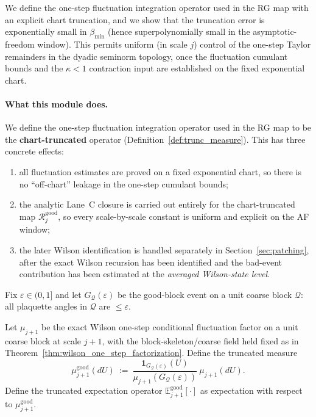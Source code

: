 We define the one-step fluctuation integration operator used in the RG map with an explicit chart truncation,
and we show that the truncation error is exponentially small in $\beta_{\min}$ (hence superpolynomially small in the asymptotic-freedom window).
This permits uniform (in scale $j$) control of the one-step Taylor remainders in the dyadic seminorm topology,
once the fluctuation cumulant bounds and the $\kappa<1$ contraction input are established on the fixed exponential chart.

\paragraph{What this module does.}
We define the one-step fluctuation integration operator used in the RG map to be the \textbf{chart-truncated} operator (Definition~\ref{def:trunc_measure}).
This has three concrete effects:
\begin{enumerate}[label=(\roman*)]
\item all fluctuation estimates are proved on a fixed exponential chart, so there is no ``off-chart'' leakage in the one-step cumulant bounds;
\item the analytic Lane~C closure is carried out entirely for the chart-truncated map $\mathcal R_j^{\mathrm{good}}$, so every scale-by-scale constant is uniform and explicit on the AF window;
\item the later Wilson identification is handled separately in Section~\ref{sec:patching}, after the exact Wilson recursion has been identified and the bad-event contribution has been estimated at the \emph{averaged Wilson-state level}.
\end{enumerate}

Fix $\varepsilon\in(0,1]$ and let $G_{\mathcal Q}(\varepsilon)$ be the good-block event on a unit coarse block $\mathcal Q$:
all plaquette angles in $\mathcal Q$ are $\le\varepsilon$.

\begin{definition}\label{def:trunc_measure}
Let $\mu_{j+1}$ be the exact Wilson one-step conditional fluctuation factor on a unit coarse block at scale $j+1$, with the block-skeleton/coarse field held fixed as in Theorem~\ref{thm:wilson_one_step_factorization}.
Define the truncated measure
\[
\mu_{j+1}^{\mathrm{good}}(dU)\ :=\ \frac{\mathbf 1_{G_{\mathcal Q}(\varepsilon)}(U)}{\mu_{j+1}(G_{\mathcal Q}(\varepsilon))}\ \mu_{j+1}(dU).
\]
Define the truncated expectation operator $\mathbb E_{j+1}^{\mathrm{good}}[\cdot]$ as expectation with respect to $\mu_{j+1}^{\mathrm{good}}$.
\end{definition}

